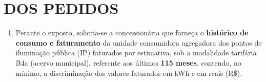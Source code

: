 \section{DOS PEDIDOS}

\begin{enumerate}[resume]
\item 
Perante o exposto, solicita-se a concessionária que forneça o \textbf{histórico de consumo e faturamento} da unidade consumidora agregadora dos pontos de iluminação pública (IP) faturados por estimativa, sob a modalidade tarifária B4a (acervo municipal), referente aos últimos \textbf{115 meses}, contendo, no mínimo, a discriminação dos valores faturados em kWh e em reais (R\$).
\end{enumerate}
